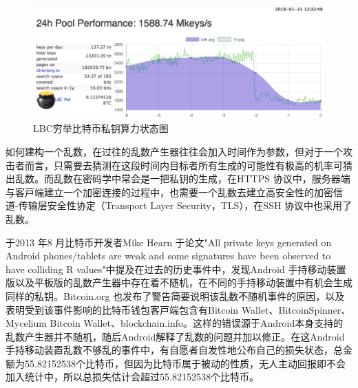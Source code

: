 				\begin{figure}[!htbp]
					\centering
					\includegraphics[width = .9\textwidth]{LBC.pdf}
					\caption{LBC穷举比特币私钥算力状态图\supercite{TheLargeBitcoinCollider}}\label{LBC}
				\end{figure}

				如何建构一个乱数，在过往的乱数产生器往往会加入时间作为参数，但对于一个攻击者而言，只需要去猜测在这段时间内目标者所有生成的可能性有极高的机率可猜出乱数。而乱数在密码学中常会是一把私钥的生成，在HTTPS 协议中，服务器端与客⼾端建⽴⼀个加密连接的过程中，也需要⼀个乱数去建⽴⾼安全性的加密信道-传输层安全性协定（Transport Layer Security，TLS）\supercite{dierks2008transport}，在SSH 协议\supercite{ThesecureshellSSHprotocolarchitecture}中也采用了乱数。
		
				于2013 年8 ⽉⽐特币开发者Mike Hearn 于论文"All private keys generated on Android phones/tablets are weak and some signatures have been observed to have colliding R values"\supercite{SomeSecureRandomThoughts}中提及在过去的历史事件中，发现Android 手持移动装置版以及平板版的乱数产生器中存在着不随机，在不同的手持移动装置中有机会生成同样的私钥。Bitcoin.org 也发布了警告\supercite{AndroidSecurityVulnerability}简要说明该乱数不随机事件的原因，以及表明受到该事件影响的⽐特币钱包客⼾端包含有Bitcoin Wallet、BitcoinSpinner、Mycelium Bitcoin Wallet、blockchain.info。这样的错误源于Android本身支持的乱数产生器并不随机，随后Android解释了乱数的问题并加以修正。在这Android手持移动装置乱数不够乱的事件中，有自愿者自发性地公布自己的损失状态，总金额为55.82152538个比特币\supercite{Badsignaturesleading}，但因为比特币属于被动的性质，无人主动回报即不会加入统计中，所以总损失估计会超过55.82152538个比特币。


